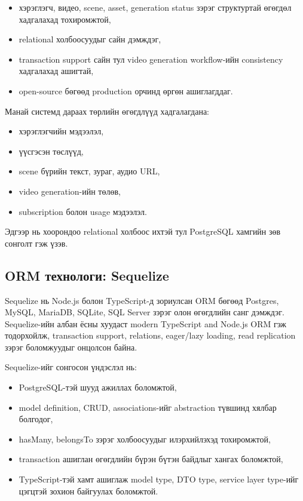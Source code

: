 \begin{itemize}
\item хэрэглэгч, видео, scene, asset, generation status зэрэг структуртай өгөгдөл хадгалахад тохиромжтой,
\item relational холбоосуудыг сайн дэмждэг,
\item transaction support сайн тул video generation workflow-ийн consistency хадгалахад ашигтай,
\item open-source бөгөөд production орчинд өргөн ашиглагддаг.
\end{itemize}

Манай системд дараах төрлийн өгөгдлүүд хадгалагдана:

\begin{itemize}
\item хэрэглэгчийн мэдээлэл,
\item үүсгэсэн төслүүд,
\item scene бүрийн текст, зураг, аудио URL,
\item video generation-ийн төлөв,
\item subscription болон usage мэдээлэл.
\end{itemize}

Эдгээр нь хоорондоо relational холбоос ихтэй тул PostgreSQL хамгийн зөв сонголт гэж үзэв.

\subsection{ORM технологи: Sequelize}

Sequelize нь Node.js болон TypeScript-д зориулсан ORM бөгөөд Postgres, MySQL, MariaDB, SQLite, SQL Server зэрэг олон өгөгдлийн санг дэмждэг. Sequelize-ийн албан ёсны хуудаст modern TypeScript and Node.js ORM гэж тодорхойлж, transaction support, relations, eager/lazy loading, read replication зэрэг боломжуудыг онцолсон байна.

Sequelize-ийг сонгосон үндэслэл нь:

\begin{itemize}
\item PostgreSQL-тэй шууд ажиллах боломжтой,
\item model definition, CRUD, associations-ийг abstraction түвшинд хялбар болгодог,
\item hasMany, belongsTo зэрэг холбоосуудыг илэрхийлэхэд тохиромжтой,
\item transaction ашиглан өгөгдлийн бүрэн бүтэн байдлыг хангах боломжтой,
\item TypeScript-тэй хамт ашиглаж model type, DTO type, service layer type-ийг цэгцтэй зохион байгуулах боломжтой.
\end{itemize}

